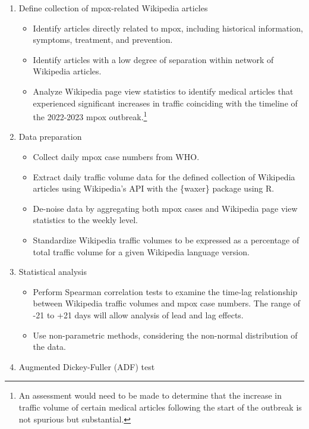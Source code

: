 \documentclass[
  letterpaper,
  DIV=11,
  numbers=noendperiod]{scrartcl}
\providecommand{\tightlist}{%
  \setlength{\itemsep}{0pt}\setlength{\parskip}{0pt}}\usepackage{longtable,booktabs,array}
\begin{document}
\begin{enumerate}
\def\labelenumi{\arabic{enumi}.}
\tightlist
\item
  Define collection of mpox-related Wikipedia articles

  \begin{itemize}
  \tightlist
  \item
    Identify articles directly related to mpox, including historical
    information, symptoms, treatment, and prevention.
  \item
    Identify articles with a low degree of separation within network of
    Wikipedia articles.
  \item
    Analyze Wikipedia page view statistics to identify medical articles
    that experienced significant increases in traffic coinciding with
    the timeline of the 2022-2023 mpox outbreak.\footnote{An assessment
      would need to be made to determine that the increase in traffic
      volume of certain medical articles following the start of the
      outbreak is not spurious but substantial.}
  \end{itemize}
\item
  Data preparation

  \begin{itemize}
  \tightlist
  \item
    Collect daily mpox case numbers from WHO.
  \item
    Extract daily traffic volume data for the defined collection of
    Wikipedia articles using Wikipedia's API with the \{waxer\} package
    using R.
  \item
    De-noise data by aggregating both mpox cases and Wikipedia page view
    statistics to the weekly level.
  \item
    Standardize Wikipedia traffic volumes to be expressed as a
    percentage of total traffic volume for a given Wikipedia language
    version.
  \end{itemize}
\item
  Statistical analysis

  \begin{itemize}
  \tightlist
  \item
    Perform Spearman correlation tests to examine the time-lag
    relationship between Wikipedia traffic volumes and mpox case
    numbers. The range of -21 to +21 days will allow analysis of lead
    and lag effects.
  \item
    Use non-parametric methods, considering the non-normal distribution
    of the data.
  \end{itemize}
\item
  Augmented Dickey-Fuller (ADF) test


\end{enumerate}
\end{document}
